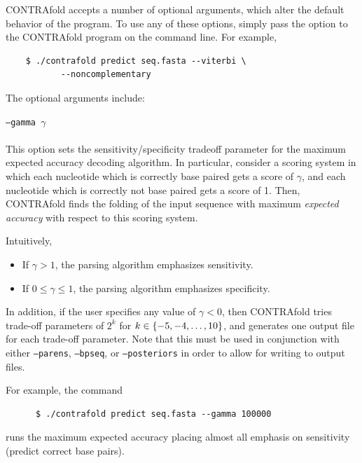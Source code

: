 \documentclass{article}
\begin{document}
  CONTRAfold accepts a number of optional arguments, which alter the default behavior
  of the program.  To use any of these options, simply pass the option to the CONTRAfold
  program on the command line.  For example,
  \begin{verbatim}
    $ ./contrafold predict seq.fasta --viterbi \
           --noncomplementary\end{verbatim}
  The optional arguments include:
  \begin{description}
  \item \texttt{--gamma $\gamma$} \\
    \\
    This option sets the sensitivity/specificity tradeoff parameter for the maximum
    expected accuracy decoding algorithm.  In particular, consider a scoring
    system in which each nucleotide which is correctly base paired gets a
    score of $\gamma$, and each nucleotide which is correctly not base paired gets
    a score of 1.  Then, CONTRAfold finds the folding of the input sequence with
    maximum \emph{expected accuracy} with respect to this scoring system.

    Intuitively,
    \begin{itemize}
    \item If $\gamma > 1$, the parsing algorithm emphasizes sensitivity.
    \item If $0 \le \gamma \le 1$, the parsing algorithm emphasizes specificity.
    \end{itemize}
    In addition, if the user specifies any value of $\gamma < 0$, then CONTRAfold
    tries trade-off parameters of $2^k$ for $k \in {\left\{{-5,-4,\ldots,10}\right\}}$, and
    generates one output file for each trade-off parameter.  Note that this
    must be used in conjunction with either 
    \texttt{--parens}, \texttt{--bpseq}, or \texttt{--posteriors} in order to
    allow for writing to output files.
    
    For example, the command
    \begin{verbatim}
      $ ./contrafold predict seq.fasta --gamma 100000\end{verbatim}
    runs the maximum expected accuracy placing almost all emphasis on sensitivity
    (predict correct base pairs).  
    

\end{description}
\end{document}
